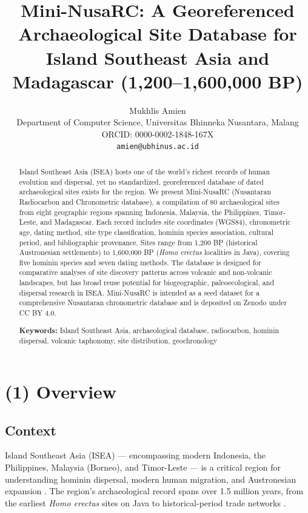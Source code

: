\documentclass[11pt]{article}
\title{Mini-NusaRC: A Georeferenced Archaeological Site Database for Island Southeast Asia and Madagascar (1,200--1,600,000 BP)}
\author{Mukhlis Amien\\
\small Department of Computer Science, Universitas Bhinneka Nusantara, Malang\\
\small ORCID: 0000-0002-1848-167X\\
\small \texttt{amien@ubhinus.ac.id}}
\date{}
\begin{document}
\maketitle

\begin{abstract}
Island Southeast Asia (ISEA) hosts one of the world's richest records of human evolution and dispersal, yet no standardized, georeferenced database of dated archaeological sites exists for the region. We present Mini-NusaRC (Nusantaran Radiocarbon and Chronometric database), a compilation of 80 archaeological sites from eight geographic regions spanning Indonesia, Malaysia, the Philippines, Timor-Leste, and Madagascar. Each record includes site coordinates (WGS84), chronometric age, dating method, site type classification, hominin species association, cultural period, and bibliographic provenance. Sites range from 1,200 BP (historical Austronesian settlements) to 1,600,000 BP (\textit{Homo erectus} localities in Java), covering five hominin species and seven dating methods. The database is designed for comparative analyses of site discovery patterns across volcanic and non-volcanic landscapes, but has broad reuse potential for biogeographic, paleoecological, and dispersal research in ISEA. Mini-NusaRC is intended as a seed dataset for a comprehensive Nusantaran chronometric database and is deposited on Zenodo under CC BY 4.0.

\noindent \textbf{Keywords:} Island Southeast Asia, archaeological database, radiocarbon, hominin dispersal, volcanic taphonomy, site distribution, geochronology
\end{abstract}

\section{(1) Overview}

\subsection{Context}

Island Southeast Asia (ISEA) --- encompassing modern Indonesia, the Philippines, Malaysia (Borneo), and Timor-Leste --- is a critical region for understanding hominin dispersal, modern human migration, and Austronesian expansion \citep{bellwood2007prehistory}. The region's archaeological record spans over 1.5 million years, from the earliest \textit{Homo erectus} sites on Java to historical-period trade networks \citep{simanjuntak2002, sémah2014java}.
\end{document}
